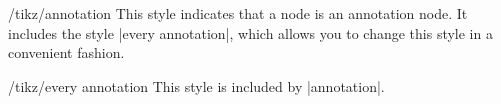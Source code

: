 \begin{stylekey}{/tikz/annotation}
  This style indicates that a node is an annotation node. It includes
  the style |every annotation|, which allows you to change this style
  in a convenient fashion.
\begin{codeexample}[]

\end{codeexample}
  \begin{stylekey}{/tikz/every annotation}
    This style is included by |annotation|.
  \end{stylekey}
\end{stylekey}



